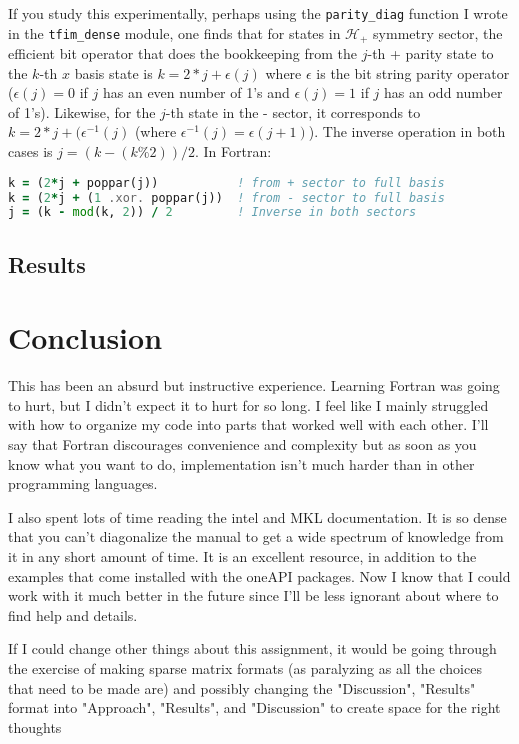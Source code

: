 \documentclass{article}
\begin{document}
If you study this experimentally, perhaps using the {\tt parity\_diag} function
I wrote in the {\tt tfim\_dense} module, one finds that for states in $\mathcal H_+$
symmetry sector, the efficient bit operator that does the bookkeeping from the $j$-th
+ parity state to the $k$-th $x$ basis state is $k = 2*j + \epsilon(j)$ where $\epsilon$
is the bit string parity operator ($\epsilon(j) = 0$ if $j$ has an even number of 1's
and $\epsilon(j) = 1$ if $j$ has an odd number of 1's).
Likewise, for the $j$-th state in the - sector, it corresponds to $k = 2*j + (\epsilon^{-1}(j)$
(where $\epsilon^{-1}(j) = \epsilon(j+1)$).
The inverse operation in both cases is $j = (k - (k \% 2)) / 2$.
In Fortran:
\begin{lstlisting}[language=Fortran]
k = (2*j + poppar(j))           ! from + sector to full basis
k = (2*j + (1 .xor. poppar(j))  ! from - sector to full basis
j = (k - mod(k, 2)) / 2         ! Inverse in both sectors
\end{lstlisting}

\subsection{
Results
}



\newpage

\section{
Conclusion
}

This has been an absurd but instructive experience.
Learning Fortran was going to hurt, but I didn't expect
it to hurt for so long.
I feel like I mainly struggled with how to organize my
code into parts that worked well with each other.
I'll say that Fortran discourages convenience and complexity
but as soon as you know what you want to do, implementation
isn't much harder than in other programming languages.

I also spent lots of time reading the intel and MKL documentation.
It is so dense that you can't diagonalize the manual to get
a wide spectrum of knowledge from it in any short amount of time.
It is an excellent resource, in addition to the examples that come
installed with the oneAPI packages.
Now I know that I could work with it much better in the future
since I'll be less ignorant about where to find help and details.

If I could change other things about this assignment, it would be
going through the exercise of making sparse matrix formats 
(as paralyzing as all the choices that need to be made are)
and possibly changing the "Discussion", "Results" format into
"Approach", "Results", and "Discussion" to create space for the right thoughts
\end{document}
